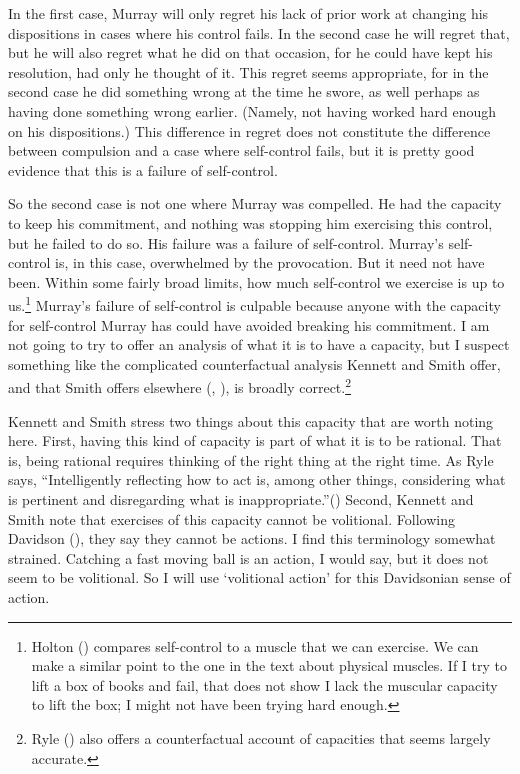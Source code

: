 \documentclass[
  11pt,
  letterpaper,
  DIV=11,
  numbers=noendperiod,
  twoside]{scrartcl}
\begin{document}
In the first case, Murray will only regret his lack of prior work at
changing his dispositions in cases where his control fails. In the
second case he will regret that, but he will also regret what he did on
that occasion, for he could have kept his resolution, had only he
thought of it. This regret seems appropriate, for in the second case he
did something wrong at the time he swore, as well perhaps as having done
something wrong earlier. (Namely, not having worked hard enough on his
dispositions.) This difference in regret does not constitute the
difference between compulsion and a case where self-control fails, but
it is pretty good evidence that this is a failure of self-control.

So the second case is not one where Murray was compelled. He had the
capacity to keep his commitment, and nothing was stopping him exercising
this control, but he failed to do so. His failure was a failure of
self-control. Murray's self-control is, in this case, overwhelmed by the
provocation. But it need not have been. Within some fairly broad limits,
how much self-control we exercise is up to us.\footnote{Holton
  () compares self-control to a muscle
  that we can exercise. We can make a similar point to the one in the
  text about physical muscles. If I try to lift a box of books and fail,
  that does not show I lack the muscular capacity to lift the box; I
  might not have been trying hard enough.} Murray's failure of
self-control is culpable because anyone with the capacity for
self-control Murray has could have avoided breaking his commitment. I am
not going to try to offer an analysis of what it is to have a capacity,
but I suspect something like the complicated counterfactual analysis
Kennett and Smith offer, and that Smith offers elsewhere
(,
), is broadly correct.\footnote{Ryle
  () also offers a counterfactual
  account of capacities that seems largely accurate.}

Kennett and Smith stress two things about this capacity that are worth
noting here. First, having this kind of capacity is part of what it is
to be rational. That is, being rational requires thinking of the right
thing at the right time. As Ryle says, ``Intelligently reflecting how to
act is, among other things, considering what is pertinent and
disregarding what is inappropriate.''() Second, Kennett and Smith note that exercises of this capacity
cannot be volitional. Following Davidson
(), they say they cannot be actions. I
find this terminology somewhat strained. Catching a fast moving ball is
an action, I would say, but it does not seem to be volitional. So I will
use `volitional action' for this Davidsonian sense of action.
\end{document}
